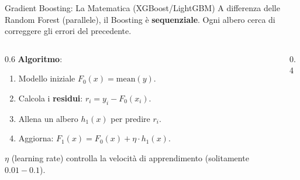 \documentclass[aspectratio=169, 10pt]{beamer}
\begin{document}
\begin{frame}{Gradient Boosting: La Matematica (XGBoost/LightGBM)}
    A differenza delle Random Forest (parallele), il Boosting è \textbf{sequenziale}.
    Ogni albero cerca di correggere gli errori del precedente.
    
    \begin{columns}[T]
        \begin{column}{0.6\textwidth}
            \textbf{Algoritmo}:
            \begin{enumerate}
                \item Modello iniziale $F_0(x) = \text{mean}(y)$.
                \item Calcola i \textbf{residui}: $r_i = y_i - F_0(x_i)$.
                \item Allena un albero $h_1(x)$ per predire $r_i$.
                \item Aggiorna: $F_1(x) = F_0(x) + \eta \cdot h_1(x)$.
            \end{enumerate}
            \small $\eta$ (learning rate) controlla la velocità di apprendimento (solitamente $0.01 - 0.1$).
        \end{column}
        \begin{column}{0.4\textwidth}
            \centering
        \end{column}
    \end{columns}
\end{frame}
\end{document}
